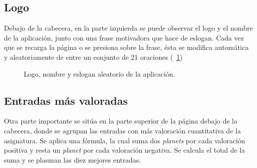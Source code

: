 \documentclass[a4paper, 12pt]{book}
\begin{document}
\subsection{Logo}
Debajo de la cabecera, en la parte izquierda se puede observar el logo y el nombre de la aplicaci\'on, junto con una frase motivadora que hace de eslogan.
Cada vez que se recarga la p\'agina o se presiona sobre la frase, \'esta se modifica autom\'atica y aleatoriamente de entre un conjunto de 21 oraciones 
(~\ref{figura:logonombrefrase})
\begin{figure}[htbp] 
  \centering
  \caption{Logo, nombre y eslogan aleatorio de la aplicaci\'on.}
  \label{figura:logonombrefrase}
\end{figure}

\subsection{Entradas m\'as valoradas}
Otra parte importante se sit\'ua en la parte superior de la p\'agina debajo de la cabecera, donde se agrupan las entradas con m\'as valoraci\'on 
cuantitativa de la asignatura. Se aplica una f\'ormula, la cual suma dos \textit{planets} por cada valoraci\'on positiva y resta un \textit{planet} por 
cada valoraci\'on negativa. Se calcula el total de la suma y se plasman las diez mejores entradas.
\end{document}

